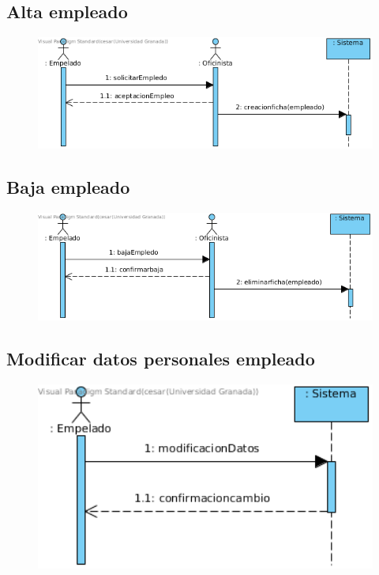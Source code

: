 \subsection{Alta empleado}
\begin{figure}[H]
	\centering
	\includegraphics[width=16cm]{1}
\end{figure}
\subsection{Baja empleado}
\begin{figure}[H]
	\centering
	\includegraphics[width=16cm]{2}
\end{figure}
\subsection{Modificar datos personales empleado}
\begin{figure}[H]
	\centering
	\includegraphics[width=16cm]{3}
\end{figure}
